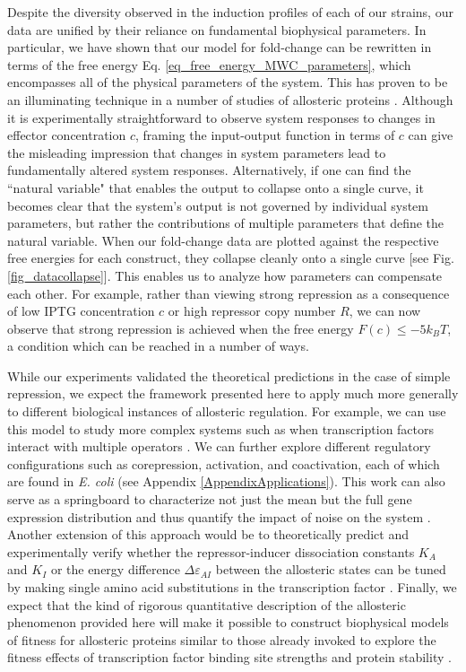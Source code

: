 Despite the diversity observed in the induction profiles of each of our
strains, our data are unified by their reliance on fundamental biophysical
parameters. In particular, we have shown that our model for fold-change can
be rewritten in terms of the free energy Eq.
\ref{eq_free_energy_MWC_parameters}, which encompasses all of the physical
parameters of the system. This has proven to be an illuminating technique in
a number of studies of allosteric proteins
\cite{Sourjik2002,Keymer2006,Swem2008}. Although it is experimentally
straightforward to observe system responses to changes in effector
concentration $c$, framing the input-output function in terms of $c$ can give
the misleading impression that changes in system parameters lead to
fundamentally altered system responses. Alternatively, if one can find the
``natural variable" that enables the output to collapse onto a single curve,
it becomes clear that the system's output is not governed by individual
system parameters, but rather the contributions of multiple parameters that
define the natural variable. When our fold-change data are plotted against
the respective free energies for each construct, they collapse cleanly onto a
single curve [see Fig. \ref{fig_datacollapse}]. This enables us to analyze
how parameters can compensate each other. For example, rather than viewing
strong repression as a consequence of low IPTG concentration $c$ or high
repressor copy number $R$, we can now observe that strong repression is
achieved when the free energy $F(c) \leq -5 k_BT$, a condition which can be
reached in a number of ways.

While our experiments validated the theoretical predictions in the case of
simple repression, we expect the framework presented here to apply much more
generally to different biological instances of allosteric regulation. For
example, we can use this model to study more complex systems such as
when transcription factors interact with multiple operators
\cite{Bintu2005}. We can further explore different regulatory configurations
such as corepression, activation, and coactivation, each of which are found in
\textit{E. coli} (see Appendix \ref{AppendixApplications}). This work can also
serve as a springboard to characterize not just the mean but the full gene
expression distribution and thus quantify the impact of noise on the system
\cite{eldar2010}. Another extension of this approach would be to theoretically
predict and experimentally verify whether the repressor-inducer dissociation
constants $K_A$ and $K_I$ or the energy difference $\Delta \varepsilon_{AI}$
between the allosteric states can be tuned by making single amino acid
substitutions in the transcription factor \cite{Daber2011a, Phillips2015a}.
Finally, we expect that the kind of rigorous quantitative description of the
allosteric phenomenon provided here will make it possible to construct
biophysical models of fitness for allosteric proteins similar to those already
invoked to explore the fitness effects of transcription factor binding site
strengths and protein stability \cite{Gerland2002, Berg2004, Zeldovich2008}.

